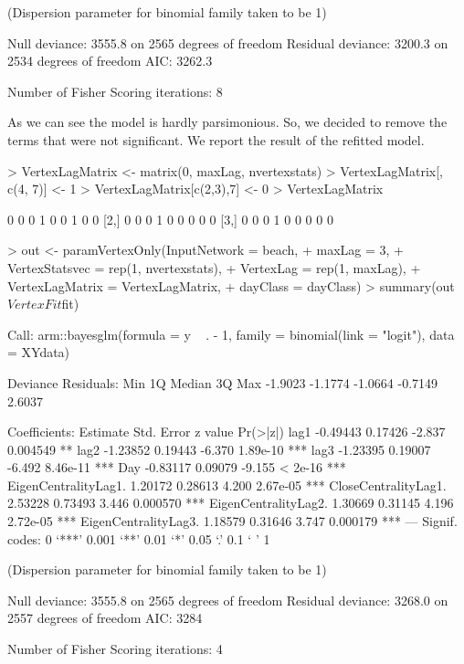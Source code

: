 \documentclass[12pt]{article}
\begin{document}
\begin{Schunk}
\begin{Soutput}
(Dispersion parameter for binomial family taken to be 1)

    Null deviance: 3555.8  on 2565  degrees of freedom
Residual deviance: 3200.3  on 2534  degrees of freedom
AIC: 3262.3

Number of Fisher Scoring iterations: 8
\end{Soutput}
\end{Schunk}

As we can see the model is hardly parsimonious. So, we decided to remove the terms that were not significant. We report the result of the refitted model.

\begin{Schunk}
\begin{Sinput}
> VertexLagMatrix <- matrix(0, maxLag, nvertexstats)
> VertexLagMatrix[, c(4, 7)] <- 1
> VertexLagMatrix[c(2,3),7] <- 0
> VertexLagMatrix
\end{Sinput}
\begin{Soutput}
     [,1] [,2] [,3] [,4] [,5] [,6] [,7] [,8] [,9]
[1,]    0    0    0    1    0    0    1    0    0
[2,]    0    0    0    1    0    0    0    0    0
[3,]    0    0    0    1    0    0    0    0    0
\end{Soutput}
\begin{Sinput}
> out <- paramVertexOnly(InputNetwork = beach,
+                        maxLag = 3,
+                        VertexStatsvec = rep(1, nvertexstats),
+                        VertexLag = rep(1, maxLag),
+                        VertexLagMatrix = VertexLagMatrix,
+                        dayClass = dayClass)
> summary(out$VertexFit$fit)
\end{Sinput}
\begin{Soutput}
Call:
arm::bayesglm(formula = y ~ . - 1, family = binomial(link = "logit"), 
    data = XYdata)

Deviance Residuals: 
    Min       1Q   Median       3Q      Max  
-1.9023  -1.1774  -1.0664  -0.7149   2.6037  

Coefficients:
                     Estimate Std. Error z value Pr(>|z|)    
lag1                 -0.49443    0.17426  -2.837 0.004549 ** 
lag2                 -1.23852    0.19443  -6.370 1.89e-10 ***
lag3                 -1.23395    0.19007  -6.492 8.46e-11 ***
Day                  -0.83117    0.09079  -9.155  < 2e-16 ***
EigenCentralityLag1.  1.20172    0.28613   4.200 2.67e-05 ***
CloseCentralityLag1.  2.53228    0.73493   3.446 0.000570 ***
EigenCentralityLag2.  1.30669    0.31145   4.196 2.72e-05 ***
EigenCentralityLag3.  1.18579    0.31646   3.747 0.000179 ***
---
Signif. codes:  0 ‘***’ 0.001 ‘**’ 0.01 ‘*’ 0.05 ‘.’ 0.1 ‘ ’ 1

(Dispersion parameter for binomial family taken to be 1)

    Null deviance: 3555.8  on 2565  degrees of freedom
Residual deviance: 3268.0  on 2557  degrees of freedom
AIC: 3284

Number of Fisher Scoring iterations: 4
\end{Soutput}
\end{Schunk}
\end{document}
